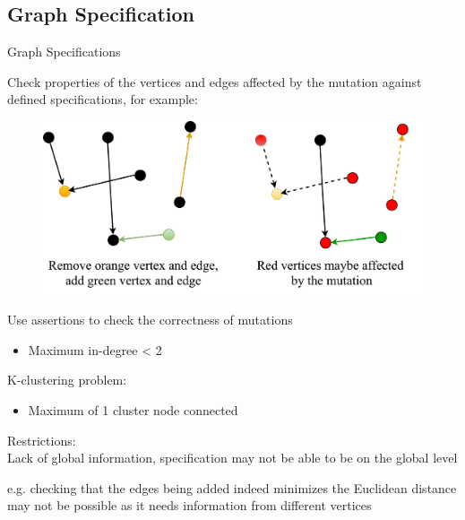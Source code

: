 
\subsection{Graph Specification}
\begin{frame}{Graph Specifications}

Check properties of the vertices and edges affected by the mutation against
defined specifications, for example:

\begin{figure}
\includegraphics[width=0.7\linewidth]{figures/fig-specification1.pdf}
\end{figure}

Use assertions to check the correctness of mutations

\begin{itemize}
  \item Maximum in-degree < 2
\end{itemize}

\end{frame}


\begin{frame}
K-clustering problem:
\begin{itemize}
  \item Maximum of 1 cluster node connected
\end{itemize}

Restrictions:\\
  Lack of global information, specification may not be able to be on the
  global level

  e.g. checking that the edges being added indeed minimizes the Euclidean
  distance may not be possible as it needs information from different vertices
\end{frame}

